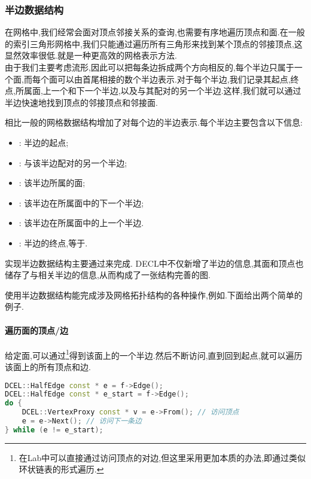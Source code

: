 \documentclass{ctexart}
\begin{document}
\subsubsection{半边数据结构}
在网格中,我们经常会面对顶点邻接关系的查询,也需要有序地遍历顶点和面.在一般的索引三角形网格中,我们只能通过遍历所有三角形来找到某个顶点的邻接顶点,这显然效率很低.就是一种更高效的网格表示方法.\\
\indent 由于我们主要考虑流形,因此可以把每条边拆成两个方向相反的,每个半边只属于一个面,而每个面可以由首尾相接的数个半边表示.对于每个半边,我们记录其起点,终点,所属面,上一个和下一个半边,以及与其配对的另一个半边.这样,我们就可以通过半边快速地找到顶点的邻接顶点和邻接面.
\begin{definition}[半边数据结构]
    相比一般的网格数据结构增加了对每个边的半边表示.每个半边主要包含以下信息:
    \begin{itemize}[topsep=0pt,parsep=0pt,itemsep=0pt,partopsep=0pt]
        \item {}: 半边的起点;
        \item {}: 与该半边配对的另一个半边;
        \item {}: 该半边所属的面;
        \item {}: 该半边在所属面中的下一个半边;
        \item {}: 该半边在所属面中的上一个半边.
        \item {}: 半边的终点,等于.
    \end{itemize}
    实现半边数据结构主要通过来完成. DECL中不仅新增了半边的信息,其面和顶点也储存了与相关半边的信息,从而构成了一张结构完善的图.
\end{definition}
使用半边数据结构能完成涉及网格拓扑结构的各种操作,例如.下面给出两个简单的例子.
\paragraph{遍历面的顶点/边}
给定面,可以通过\footnote{在Lab中可以直接通过访问顶点的对边,但这里采用更加本质的办法,即通过类似环状链表的形式遍历.}得到该面上的一个半边.然后不断访问,直到回到起点,就可以遍历该面上的所有顶点和边.
\begin{lstlisting}[language=C++]
DCEL::HalfEdge const * e = f->Edge();
DCEL::HalfEdge const * e_start = f->Edge();
do {
    DCEL::VertexProxy const * v = e->From(); // 访问顶点
    e = e->Next(); // 访问下一条边
} while (e != e_start);
\end{lstlisting}
\end{document}
